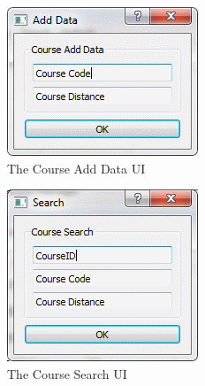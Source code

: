\begin{figure}
\includegraphics[width=\textwidth]{./Maintenance/UI/CourseAD.png}
\caption{The Course Add Data UI} \label{fig:CourseAD_UI}
\end{figure}

\begin{figure}
\includegraphics[width=\textwidth]{./Maintenance/UI/CourseSearch.png}
\caption{The Course Search UI} \label{fig:CourseSearch_UI}
\end{figure}

